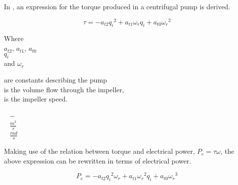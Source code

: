 In \cite{Phd_Carsten}, an expression for the torque produced in a centrifugal pump is derived. 

\begin{equation}
  \tau = -a_{t2}{q_i}^2 + a_{t1} {\omega}_r {q_i} + a_{t0} {{\omega}_r}^2
  \label{pumptorque}
\end{equation}

\begin{minipage}[t]{0.20\textwidth}
Where\\
\hspace*{8mm} $a_{t2}$, $a_{t1}$, $a_{t0}$ \\
\hspace*{8mm} $q_i$ \\
and \hspace*{0.7mm} $\omega_r$ 

\end{minipage}
\begin{minipage}[t]{0.68\textwidth}
\vspace*{2mm}
are constants describing the pump\\
is the volume flow through the impeller,\\
is the impeller speed.
\end{minipage}
\begin{minipage}[t]{0.10\textwidth}
\vspace*{2mm}
\textcolor{White}{te}$\unit{-}$\\
\textcolor{White}{te}$\unit{\frac{m^3}{s}}$\\
\textcolor{White}{te}$\unit{\frac{rad}{s}}$
\end{minipage}	

Making use of the relation between torque and electrical power, $P_e = \tau \omega$, the above expression can be rewritten in terms of electrical 
power. 

\begin{equation}
  P_e = -a_{t2}{q_i}^2{\omega}_r + a_{t1} {{\omega}_r}^2 {q_i} + a_{t0} {{\omega}_r}^3
  \label{pumptorque}
\end{equation}



